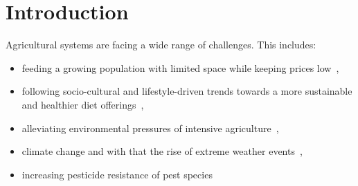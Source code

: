 \documentclass{Academic}
\begin{document}
    \myabstract{}
    \renewcommand{\myTitle}{A Survey of State of the Art Crop Rotation Prediction Approaches}
    \renewcommand{\MyAuthor}{Leon Knorr}
    \renewcommand{\MyDepartment}{Mannheim Master of Datascience}
    \renewcommand{\ID}{1902854}
    \renewcommand{\Keywords}{Agriculture, AI, Crop Rotation}
    \maketitle


    \section{Introduction}
    Agricultural systems are facing a wide range of challenges. This includes:
    \begin{itemize}
        \item feeding a growing population with limited space while keeping prices low~\cite{noauthor_oecd-fao_2021},
        \item following socio-cultural and lifestyle-driven trends towards a more sustainable and healthier diet offerings~\cite{noauthor_oecd-fao_2021},
        \item alleviating environmental pressures of intensive agriculture~\cite{upcott_new_2023},
        \item climate change and with that the rise of extreme weather events~\cite{upcott_new_2023},
        \item increasing pesticide resistance of pest species~\cite{curl_control_1963}
    \end{itemize}
\end{document}
